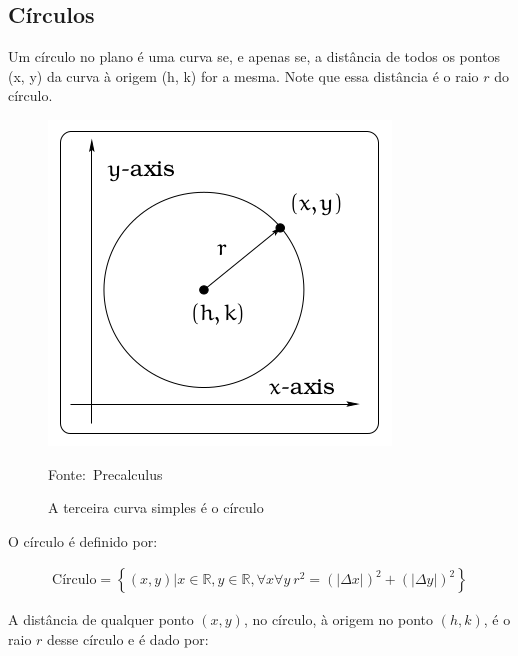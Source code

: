 \documentclass[pdftex, brazil, 12pt, twoside]{article}
\begin{document}
\subsection{Círculos}
\label{tres-curvas-circulos}

Um círculo no plano é uma curva se, e apenas se, a distância de todos os pontos
(x, y) da curva à origem (h, k) for a mesma. Note que essa distância é o raio $r$
do círculo.

\begin{figure}[ht]
  \begin{center}
    \caption{A terceira curva simples é o círculo}
    \label{fig:curvas-circulo}
    \includegraphics[scale=0.7]{imagens/definicao-circulo.png}
    
    \footnotesize{Fonte:~Precalculus}
  \end{center}
\end{figure}

O círculo é definido por:

\begin{equation}
  \begin{split}
    \text{Círculo} = \left\{(x, y) | x \in \mathbb{R}, y \in \mathbb{R}, \forall x \forall y\ r^2 = (|\Delta x|)^2 + (|\Delta y|)^2\right\}
  \end{split}
\end{equation}

A distância de qualquer ponto $(x, y)$, no círculo, à origem no ponto $(h, k)$, é o raio $r$ desse círculo
e é dado por:
\end{document}
